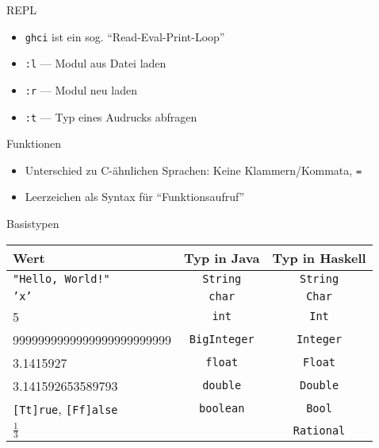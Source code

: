 \documentclass{beamer}
\begin{document}
\begin{frame}{REPL}

	\begin{itemize}
		\item \texttt{ghci} ist ein sog. \enquote{Read-Eval-Print-Loop}
                \item \texttt{:l} --- Modul aus Datei laden
                \item \texttt{:r} --- Modul neu laden
		\item \texttt{:t} --- Typ eines Audrucks abfragen
	\end{itemize}
\end{frame}

\begin{frame}{Funktionen}

	\begin{itemize}
		\item Unterschied zu C-ähnlichen Sprachen: Keine Klammern/Kommata, \texttt{=}
                \item Leerzeichen als Syntax für \enquote{Funktionsaufruf}
	\end{itemize}
\end{frame}

\begin{frame}{Basistypen}
	\begin{tabular}{ l | c | c }
		Wert & Typ in Java & Typ in Haskell \\
		\hline
		\texttt{"Hello, World!"} & \texttt{String} & \pause \texttt{String} \\
		\texttt{'x'} & \texttt{char} & \pause \texttt{Char} \\
		5 & \texttt{int} & \pause \texttt{Int} \\
		9999999999999999999999999 & \texttt{BigInteger} & \pause \texttt{Integer} \\
		3.1415927 & \texttt{float} & \pause \texttt{Float} \\
		3.141592653589793 & \texttt{double} & \pause \texttt{Double} \\
		\texttt{[Tt]rue}, \texttt{[Ff]alse} & \texttt{boolean} & \pause \texttt{Bool} \\
		$\frac{1}{3}$ & \false & \pause \texttt{Rational} \\
	\end{tabular}
\end{frame}
\end{document}
